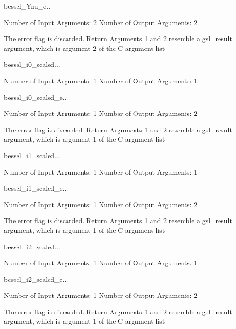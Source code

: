 \begin{funcdesc}{bessel_Ynu_e}{...}

    Number of Input  Arguments:  2
    Number of Output Arguments:  2

The error flag is discarded.
Return Arguments 1 and 2 resemble a gsl_result argument,
	which is  argument 2 of the C argument list

\end{funcdesc}

\begin{funcdesc}{bessel_i0_scaled}{...}

    Number of Input  Arguments:  1
    Number of Output Arguments:  1
\end{funcdesc}

\begin{funcdesc}{bessel_i0_scaled_e}{...}

    Number of Input  Arguments:  1
    Number of Output Arguments:  2

The error flag is discarded.
Return Arguments 1 and 2 resemble a gsl_result argument,
	which is  argument 1 of the C argument list

\end{funcdesc}

\begin{funcdesc}{bessel_i1_scaled}{...}

    Number of Input  Arguments:  1
    Number of Output Arguments:  1
\end{funcdesc}

\begin{funcdesc}{bessel_i1_scaled_e}{...}

    Number of Input  Arguments:  1
    Number of Output Arguments:  2

The error flag is discarded.
Return Arguments 1 and 2 resemble a gsl_result argument,
	which is  argument 1 of the C argument list

\end{funcdesc}

\begin{funcdesc}{bessel_i2_scaled}{...}

    Number of Input  Arguments:  1
    Number of Output Arguments:  1
\end{funcdesc}

\begin{funcdesc}{bessel_i2_scaled_e}{...}

    Number of Input  Arguments:  1
    Number of Output Arguments:  2

The error flag is discarded.
Return Arguments 1 and 2 resemble a gsl_result argument,
	which is  argument 1 of the C argument list

\end{funcdesc}

